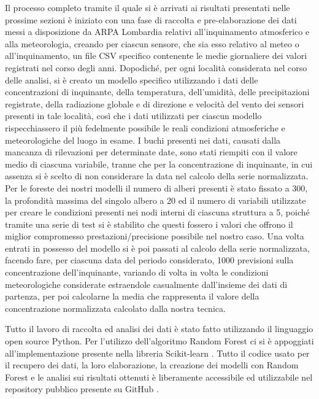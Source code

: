 \documentclass[a4paper]{report}
\begin{document}
Il processo completo tramite il quale si è arrivati ai risultati presentati nelle prossime sezioni è iniziato con una fase di raccolta e pre-elaborazione dei dati messi a disposizione da ARPA 
Lombardia relativi all'inquinamento atmosferico e alla meteorologia, creando per ciascun sensore, che sia esso relativo al meteo o all'inquinamento, un file CSV specifico contenente le medie giornaliere dei valori registrati nel corso degli anni. Dopodiché, per ogni località considerata nel corso delle analisi, si è creato un modello specifico utilizzando i dati delle concentrazioni di inquinante, della temperatura, dell'umidità, delle precipitazioni registrate, della radiazione globale e di direzione e velocità del vento dei sensori presenti in tale località, così che i dati utilizzati per ciascun modello rispecchiassero il più fedelmente possibile le reali condizioni atmosferiche e meteorologiche del luogo in esame. I buchi presenti nei dati, causati dalla mancanza di rilevazioni per determinate date, sono stati riempiti con il valore medio di ciascuna variabile, tranne che per la concentrazione di inquinante, in cui assenza si è scelto di non considerare la data nel calcolo della serie normalizzata.
Per le foreste dei nostri modelli il numero di alberi presenti è stato fissato a 300, la profondità massima del singolo albero a 20 ed il numero di variabili utilizzate per creare le condizioni presenti nei nodi interni di ciascuna struttura a 5, poiché tramite una serie di test si è stabilito che questi fossero i valori che offrono il miglior compromesso prestazioni/precisione possibile nel nostro caso. Una volta entrati in possesso del modello si è poi passati al calcolo della serie normalizzata, facendo fare, per ciascuna data del periodo considerato, 1000 previsioni sulla concentrazione dell'inquinante, variando di volta in volta le condizioni meteorologiche considerate estraendole casualmente dall'insieme dei dati di partenza, per poi calcolarne la media che rappresenta il valore della concentrazione normalizzata calcolato dalla nostra tecnica. 

Tutto il lavoro di raccolta ed analisi dei dati è stato fatto utilizzando il linguaggio open source Python. Per l'utilizzo dell'algoritmo Random Forest ci si è appoggiati all'implementazione presente nella libreria Scikit-learn \cite{scikit-learn}. Tutto il codice usato per il recupero dei dati, la loro elaborazione, la creazione dei modelli con Random Forest e le analisi sui risultati ottenuti è liberamente accessibile ed utilizzabile nel repository pubblico presente su GitHub \cite{belotti2020}.
\end{document}
